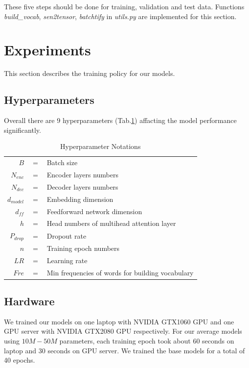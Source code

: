 \documentclass{article}
\begin{document}
These five steps should be done for training, validation and test data.
Functions \textit{build\_vocab}, \textit{sen2tensor}, \textit{batchtify} in \textit{utils.py} are implemented for this section. 

\section{Experiments}
This section describes the training policy for our models.

\subsection{Hyperparameters}
Overall there are 9 hyperparameters (Tab.\ref{tab:table_of_notation}) affacting the model performance significantly. 


\begin{table}[H]
    \caption{Hyperparameter Notations}
    \centering %
    \label{tab:table_of_notation}
    \begin{tabular}{r c p{10cm} }
    \toprule
    $B$ & $=$ & Batch size\\
    $N_{enc}$ & $=$ & Encoder layers numbers\\
    $N_{dec}$ & $=$ & Decoder layers numbers\\
    $d_{model}$ & $=$ & Embedding dimension\\
    $d_{ff}$ & $=$ & Feedforward network dimension\\  
    $h$ & $=$ & Head numbers of multihead attention layer\\  
    $P_{drop}$ & $=$ & Dropout rate\\  
    $n$ & $=$ & Training epoch numbers\\  
    $LR$ & $=$ & Learning rate\\      
    $Fre$ & $=$ & Min frequencies of words for building vocabulary\\      
    \bottomrule
    \end{tabular}
\end{table}

\subsection{Hardware}
We trained our models on one laptop with NVIDIA GTX1060 GPU and one GPU server with NVIDIA GTX2080 GPU respectively. For our average models using $10M-50M$ parameters, each training epoch took about 60 seconds on laptop and 30 seconds on GPU server. We trained the base models for a total of 40 epochs. 
\end{document}
